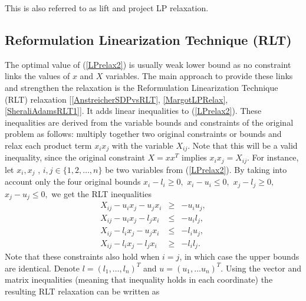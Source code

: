 \documentclass[12pt]{book}
\theoremstyle{definition}
\begin{document}
This is also referred to as lift and project LP relaxation. 

\subsection{Reformulation Linearization Technique (RLT)}
\label{SectionRLTinLP}

The optimal value of (\ref{LPrelax2}) is usually weak lower bound as no constraint links the values of $x$ and $X$ variables.
The main approach to provide these links and strengthen the relaxation is the Reformulation Linearization Technique (RLT) relaxation [\ref{AnstreicherSDPvsRLT}, \ref{MargotLPRelax}, \ref{SheraliAdamsRLT1}].
It adds linear inequalities to (\ref{LPrelax2}). These inequalities are derived from the variable bounds and 
constraints of the original problem as follows: multiply together two original constraints or bounds and relax 
each product term $x_ix_j$ with the variable $X_{ij}$. Note that this will be a valid inequality, since the original constraint $X=xx^T$ implies $x_ix_j = X_{ij}$. For instance, let $x_i, x_j$ , $i,j\in \{1, 2,\dots ,n\}$ be two variables from
(\ref{LPrelax2}). By taking into account only the four original bounds $x_i - l_i \geq 0,$ $x_i - u_i \leq 0 ,$ $ x_j - l_j \geq 0,$  $ x_j - u_j \leq 0,$ we get the RLT inequalities
\begin{equation}
\label{RLTConstraints}
\begin{array}{lcl}
X_{ij} - u_ix_j - u_jx_i  &\geq & -u_iu_j ,\\
X_{ij} - u_ix_j - l_jx_i  &\leq & -u_il_j ,\\
X_{ij} - l_ix_j - u_jx_i  &\leq & -l_iu_j ,\\
X_{ij} - l_ix_j - l_jx_i   &\geq & -l_il_j .
\end{array}
\end{equation}
 Note that these constraints also hold when $i = j$, in which case the upper bounds are identical. Denote $l = (l_1,\dots ,l_n)^T$ and $u = (u_1,\dots u_n)^T.$
 Using the vector and matrix inequalities (meaning that inequality holds in each coordinate) the resulting RLT relaxation can be written as 
 
\end{document}
